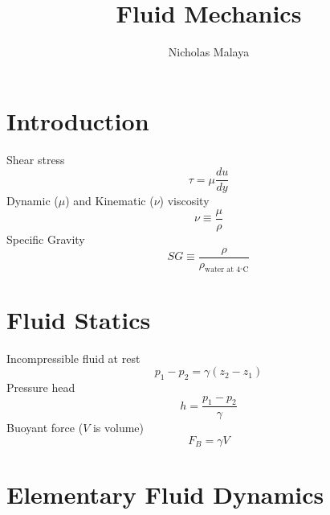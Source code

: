\documentclass{article}
\title{\bf{Fluid Mechanics}}
\author{Nicholas Malaya} \date{}
\begin{document}
\maketitle


%
%
\newpage
\section{Introduction}

Shear stress
\begin{equation}
    \tau = \mu\frac{du}{dy}
\end{equation}
\newline
\newline
Dynamic ($\mu$) and Kinematic ($\nu$) viscosity
\begin{equation}
  \nu \equiv \frac{\mu}{\rho}
\end{equation}
\newline
\newline
Specific Gravity
\begin{equation}
  SG \equiv \frac{\rho}{\rho_\text{water at 4$^\circ$C}}
\end{equation}

%
%
\section{Fluid Statics}

Incompressible fluid at rest
\begin{equation}
    p_1-p_2 = \gamma (z_2-z_1)
\end{equation}
\newline
\newline
Pressure head
\begin{equation}
    h = \frac{p_1-p_2}{\gamma}
\end{equation}
\newline
\newline
Buoyant force ($V$ is volume)
\begin{equation}
    F_B = \gamma V
\end{equation}

%
%
\newpage
\section{Elementary Fluid Dynamics}
\end{document}
